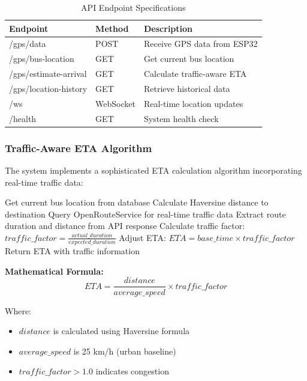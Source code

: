\documentclass[12pt,a4paper]{article}
\begin{document}
\begin{table}[H]
\centering
\begin{tabular}{|l|l|p{4cm}|}
\hline
\textbf{Endpoint} & \textbf{Method} & \textbf{Description} \\
\hline
/gps/data & POST & Receive GPS data from ESP32 \\
/gps/bus-location & GET & Get current bus location \\
/gps/estimate-arrival & GET & Calculate traffic-aware ETA \\
/gps/location-history & GET & Retrieve historical data \\
/ws & WebSocket & Real-time location updates \\
/health & GET & System health check \\
\hline
\end{tabular}
\caption{API Endpoint Specifications}
\label{tab:api_endpoints}
\end{table}

\subsubsection{Traffic-Aware ETA Algorithm}

The system implements a sophisticated ETA calculation algorithm incorporating real-time traffic data:

\begin{algorithm}
\caption{Traffic-Aware ETA Calculation}
\begin{algorithmic}[1]
\STATE Get current bus location from database
\STATE Calculate Haversine distance to destination
\STATE Query OpenRouteService for real-time traffic data
\STATE Extract route duration and distance from API response
\STATE Calculate traffic factor: $traffic\_factor = \frac{actual\_duration}{expected\_duration}$
\STATE Adjust ETA: $ETA = base\_time \times traffic\_factor$
\STATE Return ETA with traffic information
\end{algorithmic}
\end{algorithm}

\textbf{Mathematical Formula:}
\begin{equation}
ETA = \frac{distance}{average\_speed} \times traffic\_factor
\end{equation}

Where:
\begin{itemize}
    \item $distance$ is calculated using Haversine formula
    \item $average\_speed$ is 25 km/h (urban baseline)
    \item $traffic\_factor > 1.0$ indicates congestion
\end{itemize}
\end{document}
